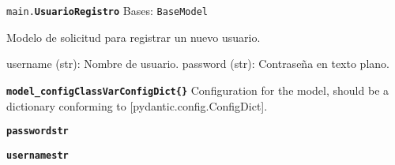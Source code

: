 \documentclass[a4paper,11pt,spanish]{sphinxmanual}
\newcommand{\robotoMonoBold}{\fontseries{b}\selectfont\ttfamily}
\renewcommand{\sphinxcode}[1]{\textcolor{sphinxorangeCode}{{\robotoMonoBold #1}}}
\renewcommand{\sphinxbfcode}[1]{\textbf{\sphinxcode{#1}}}
\renewcommand{\sphinxupquote}[1]{\texttt{#1}}
\begin{document}

\begin{fulllineitems}
\label{\detokenize{modelos:main.UsuarioRegistro}}
\pysigstartsignatures
\pysiglinewithargsret
{\sphinxbfcode{\sphinxupquote{}}\sphinxcode{\sphinxupquote{main.}}\sphinxbfcode{\sphinxupquote{UsuarioRegistro}}}
{\sphinxparamcomma {}\sphinxparamcomma {}}
{}
\pysigstopsignatures
\sphinxAtStartPar
Bases: \sphinxcode{\sphinxupquote{BaseModel}}

\sphinxAtStartPar
Modelo de solicitud para registrar un nuevo usuario.
\begin{description}
\sphinxAtStartPar
username (str): Nombre de usuario.
password (str): Contraseña en texto plano.

\end{description}

\begin{fulllineitems}
\label{\detokenize{modelos:main.UsuarioRegistro.model_config}}
\pysigstartsignatures
\pysigline
{\sphinxbfcode{\sphinxupquote{model\_config}}\sphinxbfcode{\sphinxupquote{ClassVar\DUrole{p}{{[}}ConfigDict\DUrole{p}{{]}}}}\sphinxbfcode{\sphinxupquote{\DUrole{w}{ }\{\}}}}
\pysigstopsignatures
\sphinxAtStartPar
Configuration for the model, should be a dictionary conforming to {[}\sphinxtitleref{ConfigDict}{]}{[}pydantic.config.ConfigDict{]}.

\end{fulllineitems}


\begin{fulllineitems}
\label{\detokenize{modelos:main.UsuarioRegistro.password}}
\pysigstartsignatures
\pysigline
{\sphinxbfcode{\sphinxupquote{password}}\sphinxbfcode{\sphinxupquote{str}}}
\pysigstopsignatures
\end{fulllineitems}


\begin{fulllineitems}
\label{\detokenize{modelos:main.UsuarioRegistro.username}}
\pysigstartsignatures
\pysigline
{\sphinxbfcode{\sphinxupquote{username}}\sphinxbfcode{\sphinxupquote{str}}}
\pysigstopsignatures
\end{fulllineitems}


\end{fulllineitems}
\end{document}
